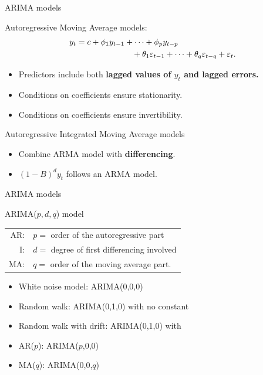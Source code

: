 \documentclass[14pt,ignorenonframetext,]{beamer}
\providecommand{\tightlist}{%
  \setlength{\itemsep}{0pt}\setlength{\parskip}{0pt}}
\begin{document}
\begin{frame}{ARIMA models}

\begin{block}{Autoregressive Moving Average models:}
\begin{align*}
y_{t}  &=  c  +  \phi_{1}y_{t - 1}  +  \cdots  +  \phi_{p}y_{t - p} \\
& \hspace*{2.4cm}\text{} + \theta_{1}\varepsilon_{t - 1} +  \cdots  + \theta_{q}\varepsilon_{t - q} +  \varepsilon_{t}.
\end{align*}
\end{block}

\pause

\begin{itemize}
\tightlist
\item
  Predictors include both \textbf{lagged values of \(y_t\) and lagged
  errors.}
\item
  Conditions on coefficients ensure stationarity.
\item
  Conditions on coefficients ensure invertibility. \pause
\end{itemize}

\begin{block}{Autoregressive Integrated Moving Average models}

\begin{itemize}
\tightlist
\item
  Combine ARMA model with \textbf{differencing}.
\item
  \((1-B)^d y_t\) follows an ARMA model.
\end{itemize}

\end{block}

\end{frame}

\begin{frame}{ARIMA models}


\begin{block}{ARIMA($p, d, q$) model}
\begin{tabular}{rl}
AR:& $p =$  order of the autoregressive part\\
I: & $d =$  degree of first differencing involved\\
MA:& $q =$  order of the moving average part.
\end{tabular}
\end{block}

\begin{itemize}
\tightlist
\item
  White noise model: ARIMA(0,0,0)
\item
  Random walk: ARIMA(0,1,0) with no constant
\item
  Random walk with drift: ARIMA(0,1,0) with 
\item
  AR(\(p\)): ARIMA(\(p\),0,0)
\item
  MA(\(q\)): ARIMA(0,0,\(q\))
\end{itemize}

\end{frame}
\end{document}

